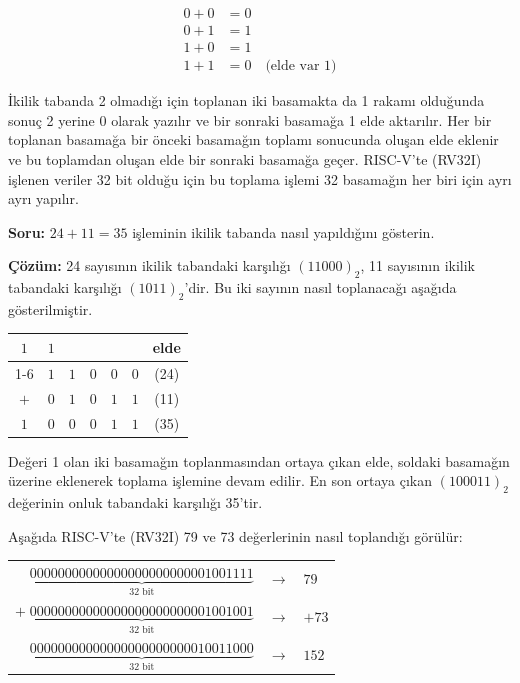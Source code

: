 \begin{align*}
0 + 0 &= 0 \\
0 + 1 &= 1 \\
1 + 0 &= 1 \\
1 + 1 &= 0 \quad \text{(elde var 1)}
\end{align*}

İkilik tabanda 2 olmadığı için toplanan iki basamakta da 1 rakamı olduğunda sonuç 2 yerine 0 olarak yazılır ve bir sonraki basamağa 1 elde aktarılır. Her bir toplanan basamağa bir önceki basamağın toplamı sonucunda oluşan elde eklenir ve bu toplamdan oluşan elde bir sonraki basamağa geçer. RISC-V'te (RV32I) işlenen veriler 32 bit olduğu için bu toplama işlemi 32 basamağın her biri için ayrı ayrı yapılır.

\begin{ornek}[5.1]
\textbf{Soru:} $24 + 11 = 35$ işleminin ikilik tabanda nasıl yapıldığını gösterin.

\textbf{Çözüm:} 24 sayısının ikilik tabandaki karşılığı $(11000)_2$, 11 sayısının ikilik tabandaki karşılığı $(1011)_2$'dir. Bu iki sayının nasıl toplanacağı aşağıda gösterilmiştir.

\begin{center}
\begin{tabular}{c c c c c c c}
$1$ & $1$ &   & & & & elde \\
\cline{1-6}
  & $1$ & $1$ & $0$ & $0$ & $0$ & (24) \\
$+$ & $0$ & $1$ & $0$ & $1$ & $1$ & (11) \\
\hline
$1$ & $0$ & $0$ & $0$ & $1$ & $1$ & (35) \\
\end{tabular}
\end{center}

Değeri 1 olan iki basamağın toplanmasından ortaya çıkan elde, soldaki basamağın üzerine eklenerek toplama işlemine devam edilir. En son ortaya çıkan $(100011)_2$ değerinin onluk tabandaki karşılığı 35'tir.
\end{ornek}

Aşağıda RISC-V'te (RV32I) 79 ve 73 değerlerinin nasıl toplandığı görülür:

\begin{center}
\small
\begin{tabular}{r c l}
$\underbrace{00000000000000000000000001001111}_{32 \text{ bit}}$ & $\rightarrow$ & $79$ \\
$+ \; \underbrace{00000000000000000000000001001001}_{32 \text{ bit}}$ & $\rightarrow$ & $+73$ \\
\hline
$\underbrace{00000000000000000000000010011000}_{32 \text{ bit}}$ & $\rightarrow$ & $152$ \\
\end{tabular}
\end{center}

